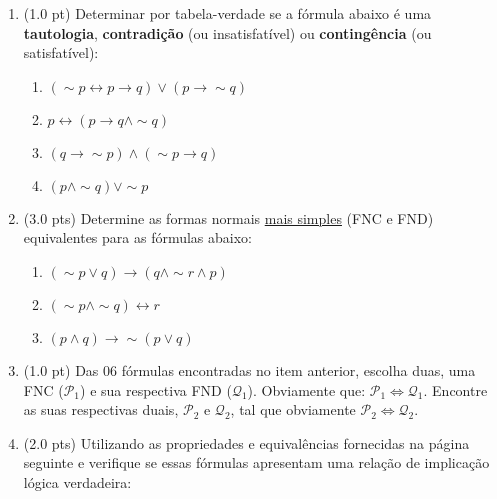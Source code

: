 \documentclass[12pt]{article}
\begin{document}
\begin{enumerate}
\itemsep 15pt
\item (1.0 pt) Determinar por tabela-verdade se a fórmula abaixo é uma {\bf tautologia}, {\bf contradição} (ou insatisfatível) ou {\bf contingência} (ou satisfatível): 

\begin{enumerate}
\setlength{\itemsep}{-2pt}
\item $(\sim p \leftrightarrow p \rightarrow q) \vee (p \rightarrow \sim q)$


\item $p \leftrightarrow (p \rightarrow q \wedge \sim q)$

\item $ (q \rightarrow \sim p) \wedge (\sim p \rightarrow  q) $ 

\item $(p \wedge \sim q) \vee \sim p$

\end{enumerate}


\item (3.0 pts) Determine as formas normais \underline{mais simples} (FNC e FND) equivalentes para as fórmulas abaixo: 
\begin{enumerate}
\setlength{\itemsep}{-2pt}

\item $(\sim p \vee q)  \rightarrow  (q \wedge \sim r \wedge p) $

\item $(\sim p \wedge \sim q) \leftrightarrow r$

\item $(p \wedge q) \rightarrow \sim (p \vee q) $

\end{enumerate}

\item (1.0 pt) Das 06 fórmulas
encontradas no item anterior, escolha duas, uma 
FNC ($\mathcal{P}_1$) e sua respectiva FND ($\mathcal{Q}_1$). Obviamente que: $\mathcal{P}_1 \Leftrightarrow \mathcal{Q}_1$. 
Encontre as suas respectivas duais,
$\mathcal{P}_2$ e $\mathcal{Q}_2$,  tal que obviamente 
$\mathcal{P}_2 \Leftrightarrow \mathcal{Q}_2$.


\item (2.0 pts) Utilizando as propriedades e equivalências
fornecidas na página seguinte
e verifique  se essas fórmulas apresentam uma relaç\~ao de implicaç\~ao lógica  verdadeira:

\begin{enumerate}
\setlength{\itemsep}{-2pt}


\end{enumerate}
\end{enumerate}
\end{document}
